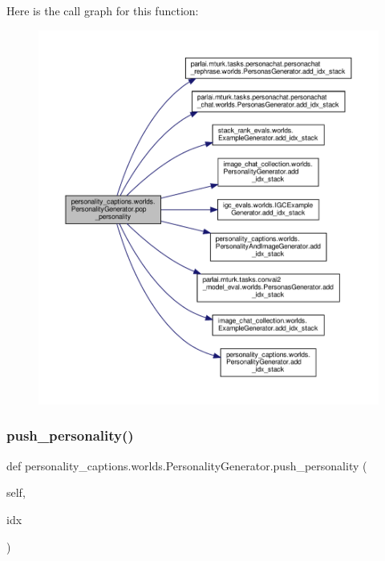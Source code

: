 Here is the call graph for this function\+:
\nopagebreak
\begin{figure}[H]
\begin{center}
\leavevmode
\includegraphics[width=350pt]{classpersonality__captions_1_1worlds_1_1PersonalityGenerator_a5d77b6f2855f26f68832d81f4b84ba99_cgraph}
\end{center}
\end{figure}
\mbox{\label{classpersonality__captions_1_1worlds_1_1PersonalityGenerator_a1a7e9fddde73adcfaf1fa9c82ae5a732}} 
\subsubsection{\texorpdfstring{push\+\_\+personality()}{push\_personality()}}
{\footnotesize\ttfamily def personality\+\_\+captions.\+worlds.\+Personality\+Generator.\+push\+\_\+personality (\begin{DoxyParamCaption}\item[{}]{self,  }\item[{}]{idx }\end{DoxyParamCaption})}



